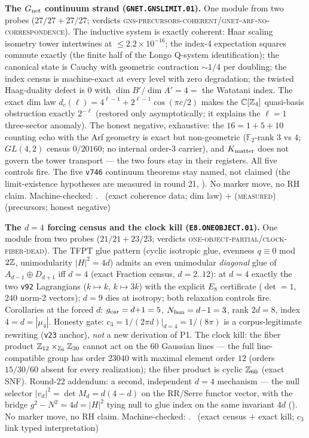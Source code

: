 \par\smallskip\noindent\textbf{The $G_{\rm net}$ continuum strand
(\texttt{GNET.GNSLIMIT.01}).}
One module from two probes ($27/27+27/27$; verdicts
\textsc{gns-precursors-coherent}/\textsc{gnet-arf-no-correspondence}).
The inductive system is exactly coherent: Haar scaling isometry
tower intertwines at $\le2.2\times10^{-16}$; the index-4
expectation squares commute exactly (the finite half of the Longo
Q-system identification); the canonical state is Cauchy with
geometric contraction ${\sim}1/4$ per doubling; the index census
is machine-exact at every level with zero degradation; the
twisted Haag-duality defect is $0$ with $\dim B'/\dim A'=4=$ the
Watatani index.  The exact dim law
$d_c(\ell)=4^{\ell-1}+2^{\ell-1}\cos(\pi c/2)$ makes the
$\mathbb C[\mathbb{Z}_4]$ quasi-basis obstruction exactly $2^{-\ell}$
(restored only asymptotically; it explains the $\ell=1$
three-sector anomaly).  The honest negative, exhaustive: the
$16=1{+}5{+}10$ counting echo with the Arf geometry is exact but
non-geometric ($\mathbb F_2$-rank $3$ vs $4$; $GL(4,2)$ census
$0/20160$; no internal order-3 carrier), and $K_{\rm matter}$ does
not govern the tower transport --- the two fours stay in their
registers.  All five controls fire.  The five \texttt{v746}
continuum theorems stay named, not claimed (the limit-existence
hypotheses are measured in round 21,
).  No marker move, no
RH claim.
Machine-checked: .
\mE\ (exact coherence data; dim law) $+$ (\textsc{measured})
(precursors; honest negative)
\par\smallskip

\par\smallskip\noindent\textbf{The $d=4$ forcing census and the
clock kill (\texttt{E8.ONEOBJECT.01}).}
One module from two probes ($21/21+23/23$; verdicts
\textsc{one-object-partial}/\textsc{clock-fiber-dead}).  The TFPT
glue pattern (cyclic isotropic glue, evenness $q\equiv0$ mod $2\mathbb{Z}$,
unimodularity $|H|^2=4d$) admits an even unimodular \emph{diagonal}
glue of $A_{d-1}\oplus D_{d+1}$ iff $d=4$ (exact Fraction census,
$d=2..12$): at $d=4$ exactly the two \texttt{v92} Lagrangians
($k\mapsto k$, $k\mapsto 3k$) with the explicit $E_8$ certificate
($\det=1$, $240$ norm-2 vectors); $d=9$ dies at isotropy; both
relaxation controls fire.  Corollaries at the forced $d$:
$g_{\mathrm{car}}=d{+}1=5$, $N_{\mathrm{fam}}=d{-}1=3$, rank $2d=8$, index
$4=d=|\mu_4|$.  Honesty gate: $c_3=1/(2\pi d)|_{d=4}=1/(8\pi)$ is a
corpus-legitimate rewriting (\texttt{v23} anchor), \emph{not} a new
derivation of P1.  The clock kill: the fiber product
$\mathbb{Z}_{12}\times_{\mathbb{Z}_6}\mathbb{Z}_{30}$ cannot act on the $60$ Gaussian lines
--- the full line-compatible group has order $23040$ with maximal
element order $12$ (orders $15/30/60$ absent for every
realization); the fiber product is cyclic $\mathbb{Z}_{60}$ (exact SNF).
Round-22 addendum: a second, independent $d=4$ mechanism ---
the null selector $|v_d|^2=\det M_d=d(4-d)$ on the RR/Serre
functor vector, with the bridge $g^2-N^2=4d=|H|^2$ tying null to
glue index on the same invariant $4d$
().
No marker move, no RH claim.
Machine-checked: .
\mE\ (exact census $+$ exact kill; $c_3$ link typed interpretation)
\par\smallskip
